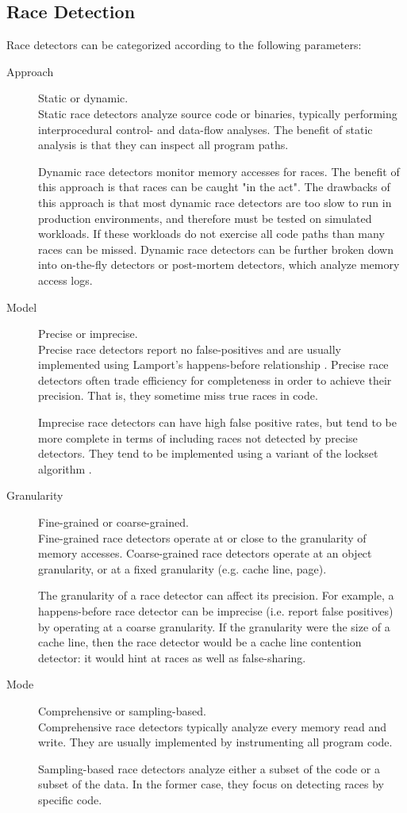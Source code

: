 \documentclass{sig-alternate}
\begin{document}
\subsection{Race Detection}

Race detectors can be categorized according to the following parameters:
\begin{description}
\item[Approach] Static or dynamic. \hfill \\
Static race detectors analyze source code or binaries, typically performing interprocedural control-
and data-flow analyses. The benefit of static analysis is that they can inspect all program paths.

Dynamic race detectors monitor memory accesses for races. The benefit of this approach is that
races can be caught "in the act". The drawbacks of this approach is that most dynamic race detectors
are too slow to run in production environments, and therefore must be tested on simulated workloads.
If these workloads do not exercise all code paths than many races can be missed. Dynamic race detectors
can be further broken down into on-the-fly detectors or post-mortem detectors, which analyze memory
access logs.

\item[Model] Precise or imprecise.  \hfill \\
Precise race detectors report no false-positives and are usually implemented using Lamport's
happens-before relationship \cite{VectorClocks}. Precise race detectors often trade efficiency
for completeness in order to achieve their precision. That is, they sometime miss true races in
code.

Imprecise race detectors can have high false positive rates, but tend to be more complete in terms of
including races not detected by precise detectors. They tend to be implemented using a variant of the
lockset algorithm \cite{Eraser}.

\item[Granularity] Fine-grained or coarse-grained. \hfill \\
Fine-grained race detectors operate at or close to the granularity of memory accesses. Coarse-grained
race detectors operate at an object granularity, or at a fixed granularity (e.g. cache line, page).

The granularity of a race detector can affect its precision. For example, a happens-before race detector 
can be imprecise (i.e. report false positives) by operating at a coarse granularity. If the granularity were
the size of a cache line, then the race detector would be a cache line contention detector: it would hint
at races as well as false-sharing.

\item[Mode] Comprehensive or sampling-based. \hfill \\
Comprehensive race detectors typically analyze every memory read and write. They are usually implemented
by instrumenting all program code.

Sampling-based race detectors analyze either a subset of the code or a subset of the data. In the former
case, they focus on detecting races by specific code.
\end{description}
\end{document}
